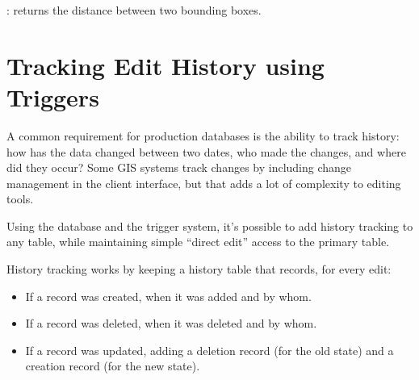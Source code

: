 \documentclass[a4paper,11pt,english]{sphinxmanual}
\begin{document}
: returns the distance between two bounding boxes.


\section{Tracking Edit History using Triggers}
\label{\detokenize{advanced:tracking-edit-history-using-triggers}}\label{\detokenize{advanced:history-tracking}}
A common requirement for production databases is the ability to track history: how has the data changed between two dates, who made the changes, and where did they occur? Some GIS systems track changes by including change management in the client interface, but that adds a lot of complexity to editing tools.

Using the database and the trigger system, it’s possible to add history tracking to any table, while maintaining simple “direct edit” access to the primary table.

History tracking works by keeping a history table that records, for every edit:
\begin{itemize}
\item {} 
If a record was created, when it was added and by whom.

\item {} 
If a record was deleted, when it was deleted and by whom.

\item {} 
If a record was updated, adding a deletion record (for the old state) and a creation record (for the new state).

\end{itemize}
\end{document}
